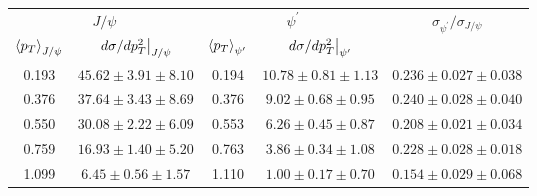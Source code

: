 \begin{tabular}{cc|cc|c}
\hline
\multicolumn{2}{c|}{$J/\psi$}                                 & \multicolumn{2}{c|}{$\psi^{\prime}$}                                 & \multirow{2}{*}{$\sigma_{\psi^\prime}/\sigma_{J/\psi}$} \\ \cline{1-4}
$\expval{p_T}_{J/\psi}$    & $\eval{d\sigma/dp^2_T}_{J/\psi}$ & $\expval{p_T}_{\psi^\prime}$ & $\eval{d\sigma/dp^2_T}_{\psi^\prime}$ &                                                         \\ \hline
\multicolumn{1}{c|}{0.193} & $45.62\pm3.91\pm8.10$            & \multicolumn{1}{c|}{0.194}   & $10.78\pm0.81\pm1.13$                 & $0.236\pm0.027\pm0.038$                                 \\
\multicolumn{1}{c|}{0.376} & $37.64\pm3.43\pm8.69$            & \multicolumn{1}{c|}{0.376}   & $9.02\pm0.68\pm0.95$                  & $0.240\pm0.028\pm0.040$                                 \\
\multicolumn{1}{c|}{0.550} & $30.08\pm2.22\pm6.09$            & \multicolumn{1}{c|}{0.553}   & $6.26\pm0.45\pm0.87$                  & $0.208\pm0.021\pm0.034$                                 \\
\multicolumn{1}{c|}{0.759} & $16.93\pm1.40\pm5.20$            & \multicolumn{1}{c|}{0.763}   & $3.86\pm0.34\pm1.08$                  & $0.228\pm0.028\pm0.018$                                 \\
\multicolumn{1}{c|}{1.099} & $6.45\pm0.56\pm1.57$             & \multicolumn{1}{c|}{1.110}   & $1.00\pm0.17\pm0.70$                  & $0.154\pm0.029\pm0.068$                                 \\ \hline
\end{tabular}
